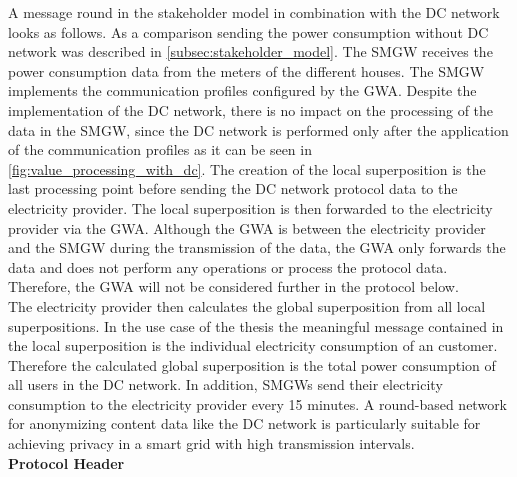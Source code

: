 A message round in the stakeholder model in combination with the DC network looks as follows. As a comparison sending the power consumption without DC network was described in \ref{subsec:stakeholder_model}. The SMGW receives the power consumption data from the meters of the different houses. The SMGW implements the communication profiles configured by the GWA. Despite the implementation of the DC network, there is no impact on the processing of the data in the SMGW, since the DC network is performed only after the application of the communication profiles as it can be seen in \ref{fig:value_processing_with_dc}. The creation of the local superposition is the last processing point before sending the DC network protocol data to the electricity provider. The local superposition is then forwarded to the electricity provider via the GWA. Although the GWA is between the electricity provider and the SMGW during the transmission of the data, the GWA only forwards the data and does not perform any operations or process the protocol data. Therefore, the GWA will not be considered further in the protocol below.\\ The electricity provider then calculates the global superposition from all local superpositions. In the use case of the thesis the meaningful message contained in the local superposition is the individual electricity consumption of an customer. Therefore the calculated global superposition is the total power consumption of all users in the DC network. In addition, SMGWs send their electricity consumption to the electricity provider every 15 minutes. A round-based network for anonymizing content data like the DC network is particularly suitable for achieving privacy in a smart grid with high transmission intervals.
\\
\textbf{Protocol Header}
\\
